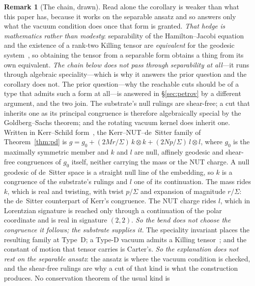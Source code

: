 \documentclass[11pt,a4paper]{article}
\theoremstyle{definition}
\newtheorem{remark}[theorem]{Remark}
\begin{document}
\begin{remark}[The chain, drawn]\label{rem:carter-chain}
Read alone the corollary is weaker than what this paper has, because it works on the separable ansatz and so
answers only what the vacuum condition does once that form is granted. \emph{That hedge is mathematics rather than
modesty}: separability of the Hamilton--Jacobi equation and the existence of a rank-two Killing tensor are
\emph{equivalent} for the geodesic system~\cite{Carter1968}, so obtaining the tensor from a separable
form obtains a thing from its own equivalent. \emph{The chain below does not pass through separability
at all}---it runs through algebraic speciality---which is why it answers the prior question and the
corollary does not. The prior question---why the reachable
cuts should be of a type that admits such a form at all---is answered in \S\ref{sec:petrov} by a different
argument, and the two join. The substrate's null rulings are shear-free; a cut that inherits one as its principal
congruence is therefore algebraically special by the Goldberg--Sachs theorem; and the rotating vacuum kernel
does inherit one. Written in Kerr--Schild form~\cite{GibbonsLuPagePope2005,ChongGibbonsLuPope2005,ChenLu2008},
the Kerr--NUT--de~Sitter family of Theorem~\ref{thm:pd} is
$g=g_{0}+(2Mr/\Sigma)\,k\otimes k+(2Np/\Sigma)\,l\otimes l$, where $g_{0}$ is the maximally symmetric member and
$k$ and $l$ are null, affinely geodesic and shear-free congruences of $g_{0}$ itself, neither carrying the mass
or the NUT charge. A null geodesic of de~Sitter space is a straight null line of the embedding, so $k$ is a
congruence of the substrate's rulings and $l$ one of its continuation. The mass
rides $k$, which is real and twisting, with twist $p/\Sigma$ and expansion of magnitude $r/\Sigma$: the de~Sitter
counterpart of Kerr's congruence. The NUT charge rides $l$, which in Lorentzian signature is reached only through
a continuation of the polar coordinate and is real in signature $(2,2)$. \emph{So the bend does not choose the
congruence it follows; the substrate supplies it.} The speciality invariant places
the resulting family at Type~D; a Type-D vacuum admits a Killing tensor~\cite{WalkerPenrose1970}; and the
constant of motion that tensor carries is Carter's. \emph{So the explanation does not
rest on the separable ansatz}: the ansatz is where the vacuum condition is checked, and the shear-free rulings
are why a cut of that kind is what the construction produces. No conservation theorem of the usual kind is

\end{remark}
\end{document}
